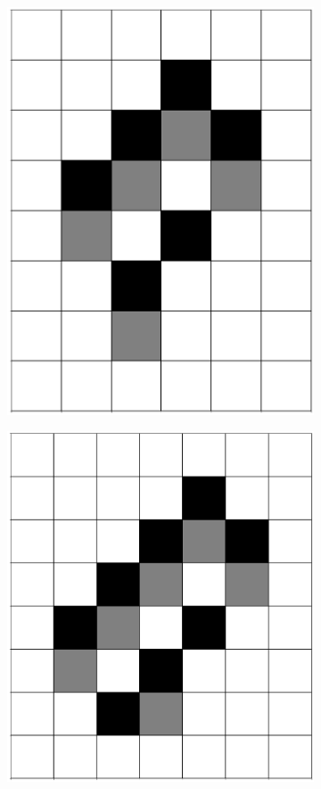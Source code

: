 \documentclass[12pt]{article}
\numberwithin{figure}{section} %
\begin{document}
\begin{figure}[H]
\begin{subfigure}{0.19\textwidth}
     \includegraphics[width=\linewidth]{Section4/21.1}
     \subcaption{}
   \end{subfigure}
        \begin{subfigure}{0.19\textwidth}
     \centering
     \includegraphics[width=\linewidth]{Section4/21.2}

\end{subfigure}
\end{figure}
\end{document}
